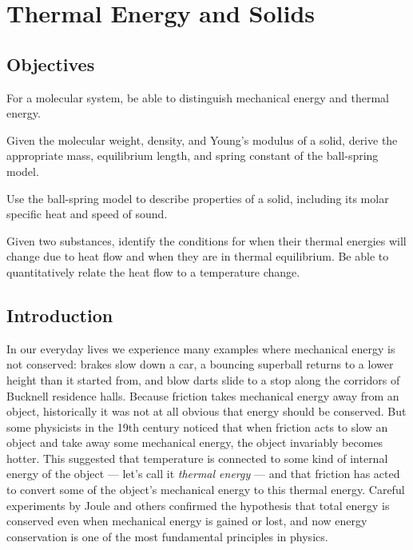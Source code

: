 \chapter{Thermal Energy and Solids}
\label{chapter:thermal_energy}

\section*{Objectives}
\begin{objectives}

\item For a molecular system, be able to distinguish mechanical energy and
  thermal energy.

\item Given the molecular weight, density, and Young's modulus of a solid,
 derive the appropriate mass, equilibrium length, and spring constant
of the ball-spring model.

\item Use the ball-spring model to describe properties of a solid, including
its molar specific heat and speed of sound.

\item Given two substances, identify the conditions for when their
  thermal energies will change due to heat flow and when they are in
  thermal equilibrium.  Be able to quantitatively relate the heat flow
  to a temperature change.

\end{objectives}

\section{Introduction}

In our everyday lives we experience many examples where mechanical
energy is not conserved: brakes slow down a car, a bouncing superball
returns to a lower height than it started from, and blow darts slide
to a stop along the corridors of Bucknell residence halls.  Because
friction takes mechanical energy away from an object, historically
it was not at all obvious that energy should be conserved.
But some physicists in the 19th century noticed that when friction
acts to slow an object and take away some mechanical energy, the
object invariably becomes hotter.  This suggested that temperature is
connected to some kind of internal energy of the object --- let's call
it {\it thermal energy} --- and that friction has acted to convert
some of the object's mechanical energy to this thermal energy.
Careful experiments by Joule and others confirmed the hypothesis that
total energy is conserved even when mechanical energy is gained or
lost, and now energy conservation is one of the most fundamental
principles in physics.

